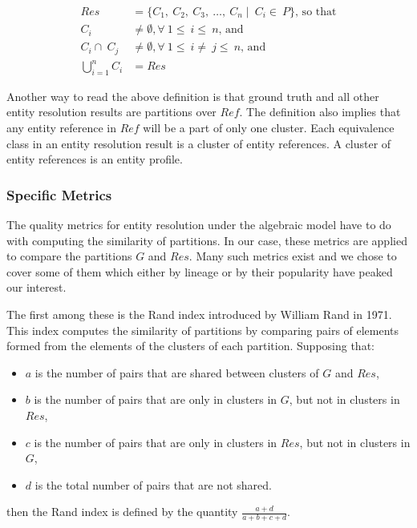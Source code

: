 \documentclass[journal]{IEEEtran}
\begin{document}
    \begin{align}
        Res &= \{C_1,~C_2,~C_3,~\ldots,~C_n\mid~C_i\in~P\}\textrm{, so that}\nonumber\\
        C_i&\neq\emptyset,\forall~1\leq~i\leq~n\textrm{,~and}\nonumber\\
        C_i\cap~C_j&\neq\emptyset,\forall~1\leq~i\neq~j\leq~n\textrm{,~and}\nonumber\\
        \bigcup_{i=1}^{n}C_i&=Res\nonumber
    \end{align}

    Another way to read the above definition is that ground truth and all other
    entity resolution results are partitions over $Ref$.
    The definition also implies that any entity reference in $Ref$ will be a
    part of only one cluster.
    Each equivalence class in an entity resolution result is a cluster of entity
    references.
    A cluster of entity references is an entity profile.

    \subsubsection[algeval]{Specific Metrics}\label{subsubsec:algeval}

    The quality metrics for entity resolution under the algebraic model have to
    do with computing the similarity of partitions.
    In our case, these metrics are applied to compare the partitions $G$ and
    $Res$.
    Many such metrics exist\cite{hitesh2012} and we chose to cover some of them
    which either by lineage or by their popularity have peaked our interest.

    The first among these is the Rand index introduced by William Rand in
    1971\cite{rand1971}.
    This index computes the similarity of partitions by comparing pairs of
    elements formed from the elements of the clusters of each partition.
    Supposing that:
    \begin{itemize}
        \item $a$ is the number of pairs that are shared between clusters of $G$
        and $Res$,
        \item $b$ is the number of pairs that are only in clusters in $G$, but
        not in clusters in $Res$,
        \item $c$ is the number of pairs that are only in clusters in $Res$, but
        not in clusters in $G$,
        \item $d$ is the total number of pairs that are not shared.
    \end{itemize}
    then the Rand index is defined by the quantity
    $\frac{a+d}{a+b+c+d}$\cite{adjrand2001}.
\end{document}
